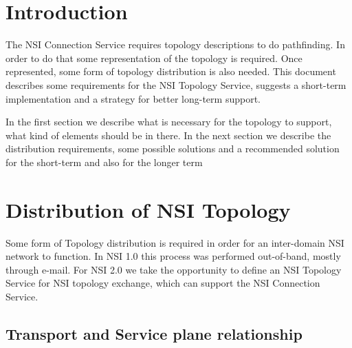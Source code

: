 \documentclass[12pt]{article}  %
\begin{document}
\tableofcontents

\newcommand{\qq}{\symbol{34}} %
\newcommand{\q}{\symbol{39}} %
\newcommand{\underscore}{\symbol{95}} %

\newcommand{\MUST}{\textsc{must}}
\newcommand{\MUSTNOT}{\textsc{must not}}
\newcommand{\REQUIRED}{\textsc{required}}
\newcommand{\SHALL}{\textsc{shall}}
\newcommand{\SHALLNOT}{\textsc{shall not}}
\newcommand{\SHOULD}{\textsc{should}}
\newcommand{\SHOULDNOT}{\textsc{should not}}
\newcommand{\RECOMMENDED}{\textsc{recommended}}
\newcommand{\MAY}{\textsc{may}}
\newcommand{\OPTIONAL}{\textsc{optional}}

\newpage

\section{Introduction}

 The NSI Connection Service requires topology descriptions to do 
pathfinding. In order to do that some representation of the topology is required. 
Once represented, some form of topology distribution is also needed. This document 
describes some requirements for the NSI Topology Service, suggests a short-term 
implementation and a strategy for better long-term support.

 In the first section we describe what is necessary for the topology 
to support, what kind of elements should be in there. In the next section we describe 
the distribution requirements, some possible solutions and a recommended solution 
for the short-term and also for the longer term\label{h.15n4tpv97j8w}


\section{Distribution of NSI Topology}

 Some form of Topology distribution is required in order for an 
inter-domain NSI network to function. In NSI 1.0 this process was performed out-of-band, 
mostly through e-mail. For NSI 2.0 we take the opportunity to define an NSI Topology 
Service for NSI topology exchange, which can support the NSI Connection Service.\label{h.c2129mkn366h}


\subsection{Transport and Service plane relationship}
\end{document}
